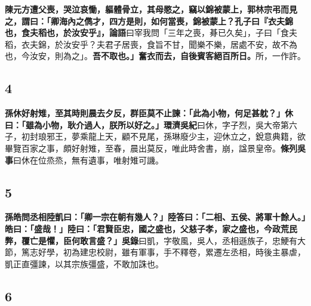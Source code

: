 \textbf{陳元方遭父喪，哭泣哀慟，軀體骨立，其母愍之，竊以錦被蒙上，郭林宗弔而見之，謂曰：「卿海內之儁才，四方是則，如何當喪，錦被蒙上？孔子曰『衣夫錦也，食夫稻也，於汝安乎』，}{\footnotesize \textbf{論語}曰宰我問「三年之喪，朞已久矣」，子曰「食夫稻，衣夫錦，於汝安乎？夫君子居喪，食旨不甘，聞樂不樂，居處不安，故不為也，今汝安，則為之」。}\textbf{吾不取也。」奮衣而去，自後賓客絕百所日。}{\footnotesize 所，一作許。}

\subsection*{4}

\textbf{孫休好射雉，至其時則晨去夕反，群臣莫不止諫：「此為小物，何足甚躭？」休曰：「雖為小物，耿介過人，朕所以好之。」}{\footnotesize \textbf{環濟吳紀}曰休，字子烈，吳大帝第六子，初封琅邪王，夢乘龍上天，顧不見尾，孫琳廢少主，迎休立之，銳意典籍，欲畢覽百家之事，頗好射雉，至春，晨出莫反，唯此時舍書，崩，諡景皇帝。\textbf{條列吳事}曰休在位烝烝，無有遺事，唯射雉可譏。}

\subsection*{5}

\textbf{孫皓問丞相陸凱曰：「卿一宗在朝有幾人？」陸答曰：「二相、五侯、將軍十餘人。」皓曰：「盛哉！」陸曰：「君賢臣忠，國之盛也，父慈子孝，家之盛也，今政荒民弊，覆亡是懼，臣何敢言盛？」}{\footnotesize \textbf{吳錄}曰凱，字敬風，吳人，丞相遜族子，忠鯁有大節，篤志好學，初為建忠校尉，雖有軍事，手不釋卷，累遷左丞相，時後主暴虐，凱正直彊諫，以其宗族彊盛，不敢加誅也。}

\subsection*{6}

